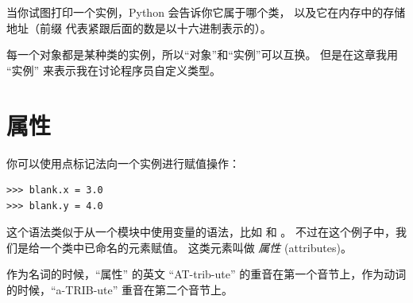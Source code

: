 当你试图打印一个实例，Python 会告诉你它属于哪个类，
以及它在内存中的存储地址（前缀  代表紧跟后面的数是以十六进制表示的）。



每一个对象都是某种类的实例，所以``对象''和``实例''可以互换。  但是在这章我用 ``实例'' 来表示我在讨论程序员自定义类型。


\section{属性}
\label{attributes}
  


你可以使用点标记法向一个实例进行赋值操作：

\begin{lstlisting}
>>> blank.x = 3.0
>>> blank.y = 4.0
\end{lstlisting}

%

这个语法类似于从一个模块中使用变量的语法，比如  和  。  不过在这个例子中，我们是给一个类中已命名的元素赋值。  这类元素叫做 {\em 属性} (attributes)。


作为名词的时候，``属性'' 的英文 ``AT-trib-ute'' 的重音在第一个音节上，作为动词的时候，``a-TRIB-ute'' 重音在第二个音节上。



